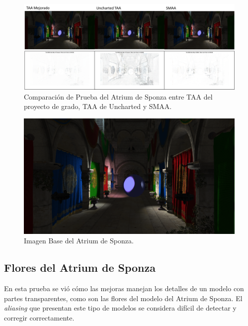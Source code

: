 \documentclass[pregrado]{tesis-usb} %
\begin{document}
\begin{figure}[!htb]
	\centering
	\includegraphics[scale=0.3]{images/results/sponza.png}
	\caption{Comparación de Prueba del Atrium de Sponza entre TAA del proyecto de grado, TAA de Uncharted y SMAA.}\label{fig:sponza_render}
\end{figure}

\begin{figure}[!htb]
	\centering
	\includegraphics[scale=0.1]{images/results/sponza_sobel_ground_truth.png}
	\caption{Imagen Base del Atrium de Sponza.}\label{fig:sponza_truth}
\end{figure}

\FloatBarrier

\subsection{Flores del Atrium de Sponza}
En esta prueba se vió cómo las mejoras manejan los detalles de un modelo con partes transparentes, como son las flores del modelo del Atrium de Sponza. El \textit{aliasing} que presentan este tipo de modelos se considera difícil de detectar y corregir correctamente. 
\end{document}
